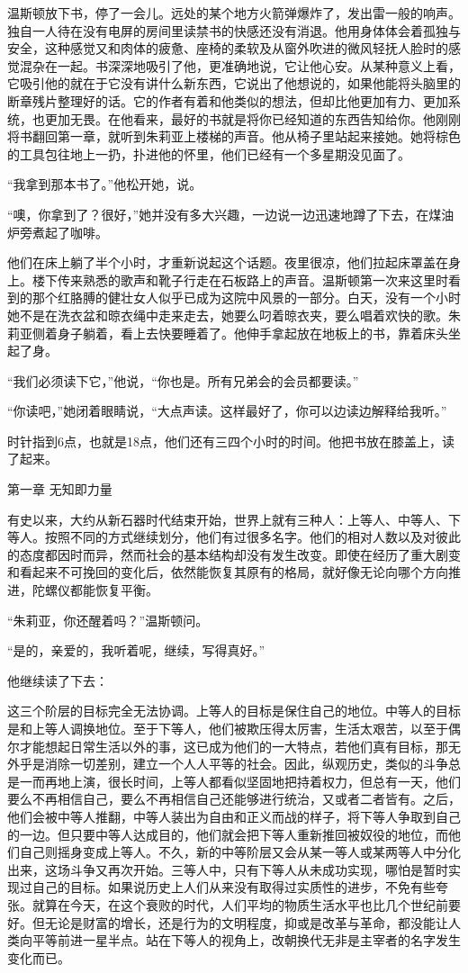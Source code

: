 温斯顿放下书，停了一会儿。远处的某个地方火箭弹爆炸了，发出雷一般的响声。独自一人待在没有电屏的房间里读禁书的快感还没有消退。他用身体体会着孤独与安全，这种感觉又和肉体的疲惫、座椅的柔软及从窗外吹进的微风轻抚人脸时的感觉混杂在一起。书深深地吸引了他，更准确地说，它让他心安。从某种意义上看，它吸引他的就在于它没有讲什么新东西，它说出了他想说的，如果他能将头脑里的断章残片整理好的话。它的作者有着和他类似的想法，但却比他更加有力、更加系统，也更加无畏。在他看来，最好的书就是将你已经知道的东西告知给你。他刚刚将书翻回第一章，就听到朱莉亚上楼梯的声音。他从椅子里站起来接她。她将棕色的工具包往地上一扔，扑进他的怀里，他们已经有一个多星期没见面了。

``我拿到那本书了。''他松开她，说。

``噢，你拿到了？很好，''她并没有多大兴趣，一边说一边迅速地蹲了下去，在煤油炉旁煮起了咖啡。

他们在床上躺了半个小时，才重新说起这个话题。夜里很凉，他们拉起床罩盖在身上。楼下传来熟悉的歌声和靴子行走在石板路上的声音。温斯顿第一次来这里时看到的那个红胳膊的健壮女人似乎已成为这院中风景的一部分。白天，没有一个小时她不是在洗衣盆和晾衣绳中走来走去，她要么叼着晾衣夹，要么唱着欢快的歌。朱莉亚侧着身子躺着，看上去快要睡着了。他伸手拿起放在地板上的书，靠着床头坐起了身。

``我们必须读下它，''他说，``你也是。所有兄弟会的会员都要读。''

``你读吧，''她闭着眼睛说，``大点声读。这样最好了，你可以边读边解释给我听。''

时针指到6点，也就是18点，他们还有三四个小时的时间。他把书放在膝盖上，读了起来。

第一章 无知即力量

有史以来，大约从新石器时代结束开始，世界上就有三种人：上等人、中等人、下等人。按照不同的方式继续划分，他们有过很多名字。他们的相对人数以及对彼此的态度都因时而异，然而社会的基本结构却没有发生改变。即使在经历了重大剧变和看起来不可挽回的变化后，依然能恢复其原有的格局，就好像无论向哪个方向推进，陀螺仪都能恢复平衡。

``朱莉亚，你还醒着吗？''温斯顿问。

``是的，亲爱的，我听着呢，继续，写得真好。''

他继续读了下去：

这三个阶层的目标完全无法协调。上等人的目标是保住自己的地位。中等人的目标是和上等人调换地位。至于下等人，他们被欺压得太厉害，生活太艰苦，以至于偶尔才能想起日常生活以外的事，这已成为他们的一大特点，若他们真有目标，那无外乎是消除一切差别，建立一个人人平等的社会。因此，纵观历史，类似的斗争总是一而再地上演，很长时间，上等人都看似坚固地把持着权力，但总有一天，他们要么不再相信自己，要么不再相信自己还能够进行统治，又或者二者皆有。之后，他们会被中等人推翻，中等人装出为自由和正义而战的样子，将下等人争取到自己的一边。但只要中等人达成目的，他们就会把下等人重新推回被奴役的地位，而他们自己则摇身变成上等人。不久，新的中等阶层又会从某一等人或某两等人中分化出来，这场斗争又再次开始。三等人中，只有下等人从未成功实现，哪怕是暂时实现过自己的目标。如果说历史上人们从来没有取得过实质性的进步，不免有些夸张。就算在今天，在这个衰败的时代，人们平均的物质生活水平也比几个世纪前要好。但无论是财富的增长，还是行为的文明程度，抑或是改革与革命，都没能让人类向平等前进一星半点。站在下等人的视角上，改朝换代无非是主宰者的名字发生变化而已。

